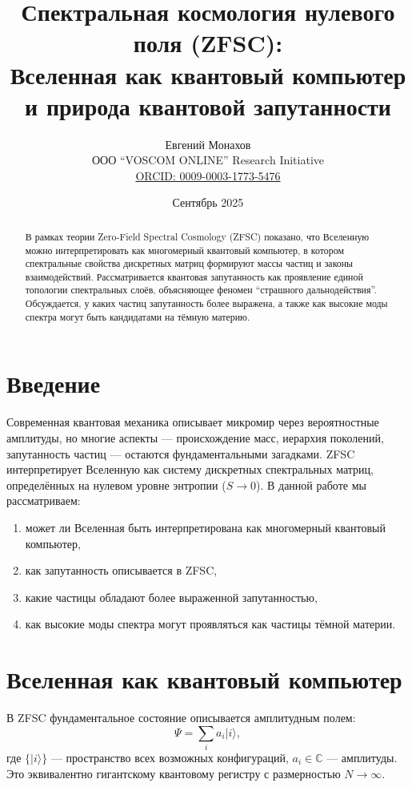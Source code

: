 \documentclass[12pt,a4paper]{article}
\title{Спектральная космология нулевого поля (ZFSC): \\
Вселенная как квантовый компьютер и природа квантовой запутанности}
\author{Евгений Монахов \\
ООО ``VOSCOM ONLINE'' Research Initiative \\
\href{https://orcid.org/0009-0003-1773-5476}{ORCID: 0009-0003-1773-5476}}
\date{Сентябрь 2025}
\begin{document}
\maketitle

\begin{abstract}
В рамках теории Zero-Field Spectral Cosmology (ZFSC) показано, что Вселенную можно интерпретировать как многомерный квантовый компьютер, в котором спектральные свойства дискретных матриц формируют массы частиц и законы взаимодействий.
Рассматривается квантовая запутанность как проявление единой топологии спектральных слоёв, объясняющее феномен ``страшного дальнодействия''.
Обсуждается, у каких частиц запутанность более выражена, а также как высокие моды спектра могут быть кандидатами на тёмную материю.
\end{abstract}

\section{Введение}
Современная квантовая механика описывает микромир через вероятностные амплитуды, но многие аспекты --- происхождение масс, иерархия поколений, запутанность частиц --- остаются фундаментальными загадками.
ZFSC интерпретирует Вселенную как систему дискретных спектральных матриц, определённых на нулевом уровне энтропии ($S \to 0$).
В данной работе мы рассматриваем:
\begin{enumerate}
  \item может ли Вселенная быть интерпретирована как многомерный квантовый компьютер,
  \item как запутанность описывается в ZFSC,
  \item какие частицы обладают более выраженной запутанностью,
  \item как высокие моды спектра могут проявляться как частицы тёмной материи.
\end{enumerate}

\section{Вселенная как квантовый компьютер}
В ZFSC фундаментальное состояние описывается амплитудным полем:
\[
\Psi = \sum_{i} a_i |i\rangle,
\]
где $\{|i\rangle\}$ --- пространство всех возможных конфигураций, $a_i \in \mathbb{C}$ --- амплитуды.
Это эквивалентно гигантскому квантовому регистру с размерностью $N \to \infty$.
\end{document}
